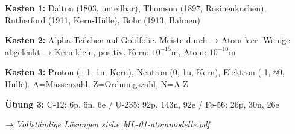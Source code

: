 \documentclass[11pt, a4paper]{article}
\begin{document}
\textbf{Kasten 1:} Dalton (1803, unteilbar), Thomson (1897, Rosinenkuchen), Rutherford (1911, Kern-Hülle), Bohr (1913, Bahnen)

\textbf{Kasten 2:} Alpha-Teilchen auf Goldfolie. Meiste durch → Atom leer. Wenige abgelenkt → Kern klein, positiv. Kern: $10^{-15}$m, Atom: $10^{-10}$m

\textbf{Kasten 3:} Proton (+1, 1u, Kern), Neutron (0, 1u, Kern), Elektron (-1, ≈0, Hülle). A=Massenzahl, Z=Ordnungszahl, N=A-Z

\textbf{Übung 3:} C-12: 6p, 6n, 6e / U-235: 92p, 143n, 92e / Fe-56: 26p, 30n, 26e

\vspace{8pt}
\textit{→ Vollständige Lösungen siehe ML-01-atommodelle.pdf}
\end{document}
